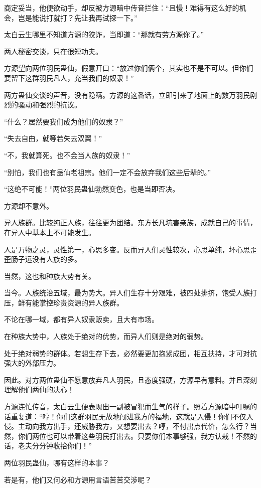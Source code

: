 \begin{this_body}
商定妥当，他便欲动手，却反被方源暗中传音拦住：“且慢！难得有这么好的机会，岂是能说打就打？先让我再试探一下。”

太白云生哪里不知道方源的狡诈，当即道：“那就有劳方源你了。”

两人秘密交谈，只在很短功夫。

方源望向两位羽民蛊仙，假意开口：“放过你们俩个，其实也不是不可以。但你们要留下这群羽民凡人，充当我们的奴隶！”

两方蛊仙交谈的声音，没有隐瞒。方源的这番话，立即引来了地面上的数万羽民剧烈的骚动和强烈的抗议。

“什么？居然要我们成为他们的奴隶？”

“失去自由，就等若失去双翼！”

“不，我就算死。也不会当人族的奴隶！”

“别怕，我们也有蛊仙老祖宗。他们一定不会放弃我们这些后辈的。”

“这绝不可能！”两位羽民蛊仙勃然变色，也是当即否决。

方源却不意外。

异人族群。比较纯正人族，往往更为团结。东方长凡坑害亲族，成就自己的事情，在异人中基本上不可能发生。

人是万物之灵，灵性第一，心思多变。反而异人们灵性较次，心思单纯，坏心思歪歪肠子远没有人族的多。

当然，这也和种族大势有关。

当今。人族统治五域，最为势大。异人们生存十分艰难，被四处排挤，饱受人族打压，鲜有能掌控珍贵资源的异人族群。

不论在哪一域，都有异人奴隶贩卖，且大有市场。

在种族大势中，人族处于绝对的优势，而异人们则是绝对的弱势。

处于绝对弱势的群体。若想生存下去，必然要更加抱紧成团，相互扶持，才可对抗强大的外部压力。

因此。对方两位蛊仙不愿意放弃凡人羽民，且态度强硬，方源早有意料。并且深刻理解他们两仙的决心！

方源连忙传音，太白云生便表现出一副被冒犯而生气的样子。照着方源暗中叮嘱的话重复道：“哼！你们这群羽民无故地闯进我方的福地，这就是入侵！你们不仅入侵。主动向我方出手，还威胁我方，又想要出去？哼，不付出点代价，怎么行？当然，你们两位也可以带着这些羽民打出去。只要你们本事够强，我方认栽！不然的话，老夫分分钟收拾你们！”

两位羽民蛊仙，哪有这样的本事？

若是有，他们又何必和方源用言语苦苦交涉呢？


\end{this_body}
